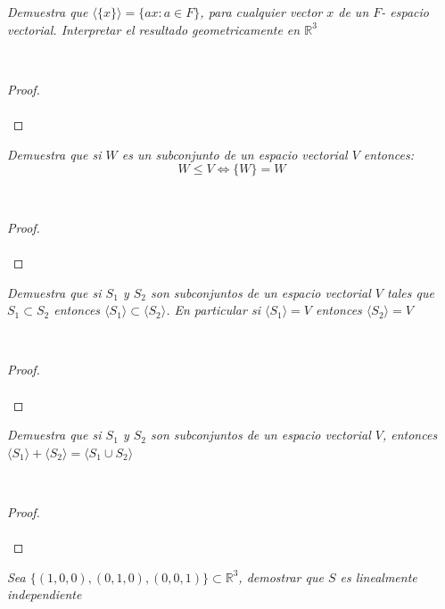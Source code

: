 \documentclass[11pt,letterpaper]{article}
\newcommand{\R}{\mathbb{R}}
\begin{document}
\begin{tcolorbox}[
	title = \textcolor{black}{\textcolor{white}{Problema 4}},]
\textit{Demuestra que $\langle\{x\}\rangle=\{ax:a\in F\}$, para cualquier vector $x$ de un $F$- espacio vectorial. Interpretar el resultado geometricamente en $\R^3$
}
\end{tcolorbox}\,\\
\begin{proof}\,\\
    \,\\
\end{proof}
\begin{tcolorbox}[
	title = \textcolor{black}{\textcolor{white}{Problema 5}},]
\textit{Demuestra que si $W$ es un subconjunto de un espacio vectorial $V$ entonces:\,\\
\begin{equation*}
    W\leq V \iff \{W\}=W 
\end{equation*}
}
\end{tcolorbox}\,\\
\begin{proof}\,\\
    \,\\
\end{proof}
\begin{tcolorbox}[
	title = \textcolor{black}{\textcolor{white}{Problema 6}},]
\textit{Demuestra que si $S_1$ y $S_2$ son subconjuntos de un espacio vectorial $V$ tales que $S_1\subset S_2$
entonces $\langle S_1 \rangle \subset \langle S_2 \rangle$. En particular si $\langle S_1 \rangle =V$ entonces $\langle S_2 \rangle =V$
}
\end{tcolorbox}\,\\
\begin{proof}\,\\
    \,\\
\end{proof}
\begin{tcolorbox}[
	title = \textcolor{black}{\textcolor{white}{Problema 7}},]
\textit{Demuestra que si $S_1$ y $S_2$ son subconjuntos de un espacio vectorial $V$, entonces
$\langle S_1 \rangle+ \langle  S_2\rangle=\langle S_1\cup S_2 \rangle  $
}
\end{tcolorbox}\,\\
\begin{proof}\,\\
    \,\\
\end{proof}
\begin{tcolorbox}[
	title = \textcolor{black}{\textcolor{white}{Problema 8}},]
\textit{Sea $\{(1,0,0),(0,1,0),(0,0,1)\}\subset \R^3$, demostrar que $S$ es linealmente independiente
}
\end{tcolorbox}\,\\
\end{document}
